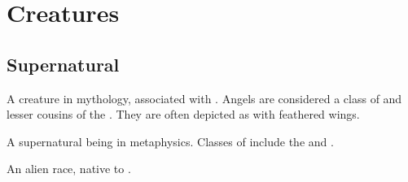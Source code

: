 \section{Creatures}
\subsection{Supernatural}
\begin{gloss}







\begin{comment}
\paragraph{angel}
\end{comment}
A creature in  mythology, associated with \iquin. 
Angels are considered a class of  and lesser cousins of the . 
They are often depicted as  with feathered wings. 







\begin{comment}
\paragraph{\Archon}
\end{comment}
\gitem{\Archon}
A supernatural being in  metaphysics. %
Classes of \Archons{} include the  and . 







\begin{comment}
\paragraph{\bane}
\end{comment}
\gitem[\banes]{\bane}
An alien race, native to . 








\begin{comment}

\end{comment}
\end{gloss}
